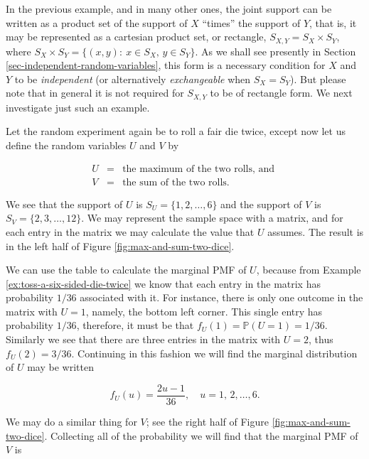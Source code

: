 \documentclass[]{book}
\numberwithin{equation}{chapter}
\numberwithin{figure}{chapter}
\theoremstyle{plain}
\theoremstyle{definition}
\theoremstyle{remark}
\theoremstyle{definition}
\theoremstyle{definition}
\theoremstyle{remark}
\let\BeginKnitrBlock\begin \let\EndKnitrBlock\end
\begin{document}
In the previous example, and in many other ones, the joint support can
be written as a product set of the support of \(X\) ``times'' the
support of \(Y\), that is, it may be represented as a cartesian product
set, or rectangle, \(S_{X,Y}=S_{X}\times S_{Y}\), where
\(S_{X} \times S_{Y}= \{ (x,y):\ x\in S_{X},\, y\in S_{Y} \}\). As we
shall see presently in Section \ref{sec-independent-random-variables},
this form is a necessary condition for \(X\) and \(Y\) to be
\emph{independent} (or alternatively \emph{exchangeable} when
\(S_{X}=S_{Y}\)). But please note that in general it is not required for
\(S_{X,Y}\) to be of rectangle form. We next investigate just such an
example.

\bigskip

\BeginKnitrBlock{example}
\protect\hypertarget{ex:max-sum-two-dice}{}{\label{ex:max-sum-two-dice}}Let
the random experiment again be to roll a fair die twice, except now let
us define the random variables \(U\) and \(V\) by

\begin{eqnarray*}
U & = & \mbox{the maximum of the two rolls, and }\\
V & = & \mbox{the sum of the two rolls.}
\end{eqnarray*}

We see that the support of \(U\) is \(S_{U}= \{ 1,2,\ldots,6 \}\) and
the support of \(V\) is \(S_{V}= \{ 2,3,\ldots,12 \}\). We may represent
the sample space with a matrix, and for each entry in the matrix we may
calculate the value that \(U\) assumes. The result is in the left half
of Figure \ref{fig:max-and-sum-two-dice}.
\EndKnitrBlock{example}

We can use the table to calculate the marginal PMF of \(U\), because
from Example \ref{ex:toss-a-six-sided-die-twice} we know that each entry
in the matrix has probability \(1/36\) associated with it. For instance,
there is only one outcome in the matrix with \(U=1\), namely, the bottom
left corner. This single entry has probability \(1/36\), therefore, it
must be that \(f_{U}(1)=\mathbb{P}(U=1)=1/36\). Similarly we see that
there are three entries in the matrix with \(U=2\), thus
\(f_{U}(2)=3/36\). Continuing in this fashion we will find the marginal
distribution of \(U\) may be written

\begin{equation}
f_{U}(u)=\frac{2u-1}{36},\quad u=1,\,2,\ldots,6.
\end{equation}

We may do a similar thing for \(V\); see the right half of Figure
\ref{fig:max-and-sum-two-dice}. Collecting all of the probability we
will find that the marginal PMF of \(V\) is
\end{document}
